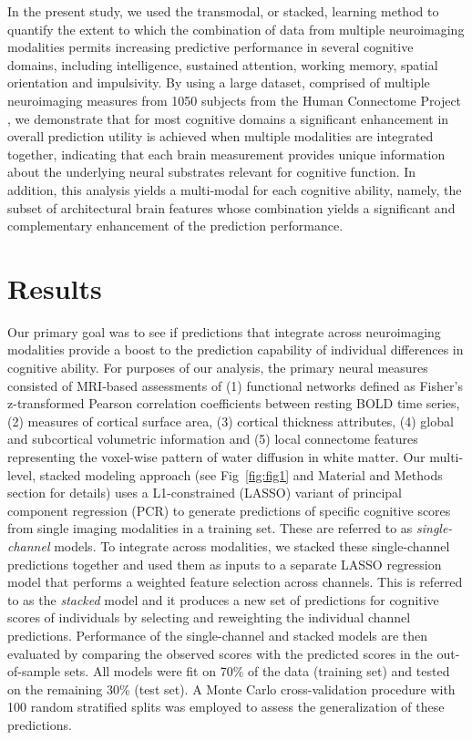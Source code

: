 \documentclass[10pt,letterpaper]{article}
\begin{document}
In the present study, we used the transmodal, or stacked, learning method to quantify the extent to which the combination of data from multiple neuroimaging modalities permits increasing predictive performance in several cognitive domains, including intelligence, sustained attention, working memory, spatial orientation and impulsivity. By using a large dataset, comprised of multiple neuroimaging measures from 1050 subjects from the Human Connectome Project \cite{VANESSEN201362}, we demonstrate that for most cognitive domains a significant enhancement in overall prediction utility is achieved when multiple modalities are integrated together,  indicating that each brain measurement provides unique information about the underlying neural substrates relevant for cognitive function. In addition, this analysis yields a multi-modal  for each cognitive ability, namely, the subset of architectural brain features whose combination yields a significant and complementary enhancement of the prediction performance.


\section*{Results} \label{sec:results}

Our primary goal was to see if predictions that integrate across neuroimaging modalities provide a boost to the prediction capability of individual differences in cognitive ability. For purposes of our analysis, the primary neural measures consisted of MRI-based assessments of (1) functional networks defined as Fisher's z-transformed Pearson correlation coefficients between resting BOLD time series, (2) measures of cortical surface area, (3) cortical thickness attributes, (4) global and subcortical volumetric information and (5) local connectome features representing the voxel-wise pattern of water diffusion in white matter. Our multi-level, stacked modeling approach (see Fig~\ref{fig:fig1} and Material and Methods section for details) uses a L1-constrained (LASSO) variant of principal component regression (PCR) to generate predictions of specific cognitive scores from single imaging modalities in a training set. These are referred to as \textit{single-channel} models. To integrate across modalities, we stacked these single-channel predictions together and used them as inputs to a separate LASSO regression model that performs a weighted feature selection across channels. This is referred to as the \textit{stacked} model and it produces a new set of predictions for cognitive scores of individuals by selecting and reweighting the individual channel predictions.  Performance of the single-channel and stacked models are then evaluated by comparing the observed scores with the predicted scores in the out-of-sample sets. All models were fit on 70\% of the data (training set) and tested on the remaining 30\% (test set). A Monte Carlo cross-validation procedure \cite{Shao1993} with 100 random stratified splits was employed to assess the generalization of these predictions.
\end{document}
